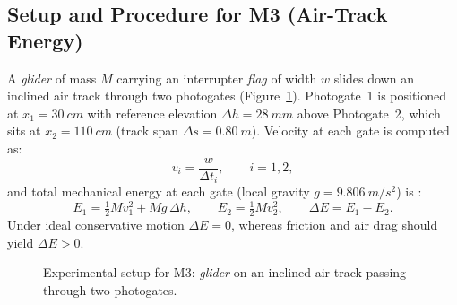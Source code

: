 \documentclass[a4paper, 12pt]{article}
\begin{document}
        \subsection{Setup and Procedure for M3 (Air-Track Energy)}
        A \textit{glider} of mass $M$ carrying an interrupter \textit{flag} of width $w$ slides down an inclined air track through two photogates (Figure~\ref{fig:skema}). Photogate~1 is positioned at $x_1=\SI{30}{cm}$ with reference elevation $\Delta h=\SI{28}{mm}$ above Photogate~2, which sits at $x_2=\SI{110}{cm}$ (track span $\Delta s=\SI{0.80}{m}$). Velocity at each gate is computed as:
        \begin{equation}
            v_i=\frac{w}{\Delta t_i},\qquad i=1,2,
            \label{eq:v}
        \end{equation}
        and total mechanical energy at each gate (local gravity $g=\SI{9.806}{m/s^2}$) is \parencite{HallidayResnickWalker}:
        \begin{equation}
            E_1=\tfrac{1}{2}Mv_1^{2}+Mg\,\Delta h,\qquad
            E_2=\tfrac{1}{2}Mv_2^{2},\qquad
            \Delta E=E_1-E_2.
            \label{eq:E}
        \end{equation}
        Under ideal conservative motion $\Delta E=0$, whereas friction and air drag should yield $\Delta E>0$.
\begin{figure}[H]
\centering
{}
\caption{Experimental setup for M3: \textit{glider} on an inclined air track passing through two photogates.}
\label{fig:skema}
\end{figure}
\end{document}
